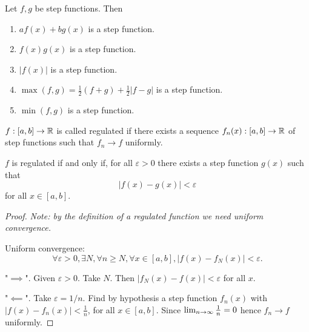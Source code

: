 \documentclass[10pt, a4paper]{article}
\begin{document}
\begin{proposition}
    Let $f, g$ be step functions.
    Then
    \begin{enumerate}[label = (\roman*)]
        \item $af(x) + bg(x)$ is a step function.

        \item $f(x)g(x)$ is a step function.

        \item $|f(x)|$ is a step function.

        \item $\max(f, g) = \frac{1}{2}(f + g) + \frac{1}{2}|f - g|$ is a step function.

        \item $\min(f, g)$ is a step function.
    \end{enumerate}
\end{proposition}

\begin{definition}
    $f : [a, b] \to \mathbb{R}$ is called regulated if there exists a sequence $f_n(x) : [a, b] \to \mathbb{R}$ of step functions such that $f_n \to f$ uniformly.
\end{definition}

\begin{lemma}
    $f$ is regulated if and only if,
    for all $\varepsilon > 0$ there exists a step function $g(x)$ such that
    \[
    |f(x) - g(x)| < \varepsilon
    \]
    for all $x \in [a, b]$.

    \begin{proof}
        \textit{Note:
        by the definition of a regulated function we need uniform convergence.}
        
        Uniform convergence:
        \[
        \forall \varepsilon > 0, \exists N, \forall n \geq N, \forall x \in [a, b], |f(x) - f_N(x)| < \varepsilon.
        \]
        
        "$\implies$".
        Given $\varepsilon > 0$.
        Take $N$.
        Then $|f_N(x) - f(x)| < \varepsilon$ for all $x$.

        "$\impliedby$".
        Take $\varepsilon = 1 / n$.
        Find by hypothesis a step function $f_n(x)$ with $|f(x) - f_n(x)| < \frac{1}{n}$,
        for all $x \in [a, b]$.
        Since $\lim_{n \rightarrow \infty}\frac{1}{n} = 0$ hence $f_n \to f$ uniformly.
    \end{proof}
\end{lemma}
\end{document}

